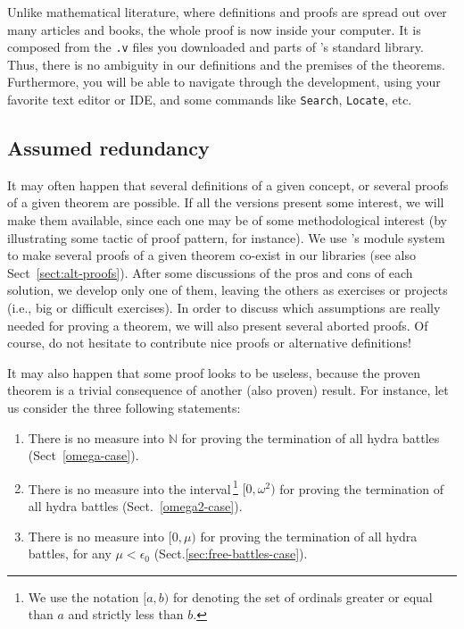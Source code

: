 \documentclass[twoside,a4paper]{book}
\begin{document}
Unlike mathematical literature, where definitions and proofs are spread out over many articles and books,
the whole proof is now inside your computer. It is composed from the \texttt{.v} files you downloaded and
parts of \coq's standard library. Thus, there is no ambiguity in our definitions and the premises of the theorems. Furthermore, you will be able to navigate through the development, using your favorite text editor or IDE, and some commands like \texttt{Search}, \texttt{Locate},  etc.



\subsection{Assumed redundancy}

It may often happen that several definitions of a given concept, or several proofs of a given theorem are possible. If all the versions present some interest, we will make them available, since each one may be of some methodological 
interest (by illustrating some tactic of proof pattern, for instance).
We use \coq's module system to make several proofs of a given theorem co-exist in our libraries (see also Sect~\vref{sect:alt-proofs}).
After some discussions of the pros and cons of each solution, we develop only one of them, leaving the others  as exercises or projects (i.e., big or difficult exercises).
In order to discuss which assumptions are really needed for proving a theorem, we will also present 
several aborted proofs.
Of course, do not hesitate to contribute nice proofs or alternative definitions!

It may also happen that some proof looks to be useless, because the proven theorem is a trivial consequence of another (also proven) result.
For instance, let us consider the three following statements:
\begin{enumerate}
\item There is no measure into $\mathbb{N}$ for proving the termination of all hydra battles (Sect~\vref{omega-case}).
\item There is no measure into the interval\,\footnote{We use the notation $[a,b)$ for denoting the set of ordinals greater or equal than $a$ and strictly less than $b$.}  $[0,\omega^2)$ for proving the termination of all hydra battles (Sect.~\vref{omega2-case}).
\item There is no measure into $[0,\mu)$ for proving the termination of all hydra battles, for any $\mu<\epsilon_0$ (Sect.\vref{sec:free-battles-case}).
\end{enumerate}
\end{document}
